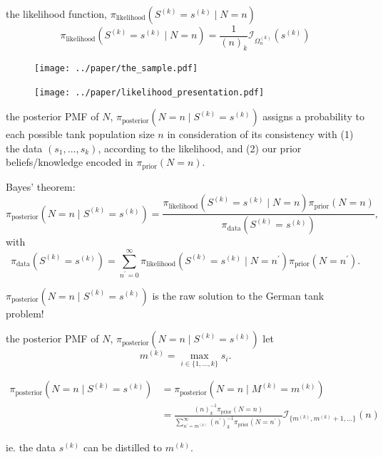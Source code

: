 \documentclass[10pt]{beamer}
\newcommand{\data}{$(s_1, ..., s_k)$\xspace}
\begin{document}
\begin{frame}[t]{the likelihood function, $\pi_{\text{likelihood}}(S^{(k)}=s^{(k)} \mid N=n)$}
\begin{equation*}
	\pi_{\text{likelihood}}(S^{(k)}=s^{(k)} \mid N=n)=
	\dfrac{1}{(n)_k} \mathcal{I}_{\Omega_n^{(k)}}\left(s^{(k)}\right)
\end{equation*}

\begin{figure}[h!]
	\centering
	\texttt{[image: ../paper/the\_sample.pdf]}
	
	\texttt{[image: ../paper/likelihood\_presentation.pdf]}
\end{figure}
\end{frame}

\begin{frame}[t]{the posterior PMF of $N$, $\pi_{\text{posterior}}(N=n \mid S^{(k)}=s^{(k)})$}
 assigns a probability to each possible tank population size $n$ in consideration of its consistency with (1) the data \data, according to the likelihood, and (2) our prior beliefs/knowledge encoded in $\pi_{\text{prior}}(N=n)$. 

\pause 

\alert{Bayes' theorem}:
\begin{equation*}
	\pi_{\text{posterior}}(N=n \mid S^{(k)}=s^{(k)}) = 
	\frac{\pi_{\text{likelihood}}(S^{(k)}=s^{(k)} \mid N=n) \pi_{\text{prior}}(N=n)}{\pi_{\text{data}}(S^{(k)}=s^{(k)})},
\end{equation*} with
\begin{equation*}
	\pi_{\text{data}}(S^{(k)}=s^{(k)})= \displaystyle \sum_{n^\prime=0}^\infty \pi_{\text{likelihood}}(S^{(k)}=s^{(k)} \mid N=n^\prime) \pi_{\text{prior}}(N=n^\prime). \label{eq:prob_data}
\end{equation*}

\pause 
$\pi_{\text{posterior}}(N=n \mid S^{(k)}=s^{(k)})$ is the raw solution to the German tank problem!
\end{frame}

\begin{frame}[t]{the posterior PMF of $N$, $\pi_{\text{posterior}}(N=n \mid S^{(k)}=s^{(k)})$}
let 
\begin{equation*}
    m^{(k)} = \max_{i \in \{1, ..., k\}} s_i .
\end{equation*} 

\pause 
\begin{align*}
	\pi_{\text{posterior}}(N=n \mid S^{(k)}=s^{(k)}) &= \pi_{\text{posterior}}(N=n \mid M^{(k)}=m^{(k)}) \\
	& =\frac{
		\displaystyle (n)_k^{-1} \pi_{\text{prior}}(N=n)
	}{
		\displaystyle \sum_{n^\prime=m^{(k)}}^\infty (n^\prime)_{k}^{-1}  \pi_{\text{prior}}(N=n^\prime)
	}
	\mathcal{I}_{\{m^{(k)}, m^{(k)}+1,...\}}(n)
	\label{eq:post_simple}
\end{align*}

ie. the data $s^{(k)}$ can be distilled to $m^{(k)}$.
\end{frame}
\end{document}
